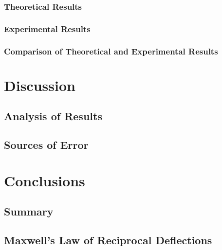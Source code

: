 \documentclass[12pt, titlepage]{article}
\begin{document}
\subsubsection{Theoretical Results}
\subsubsection{Experimental Results}
\subsubsection{Comparison of Theoretical and Experimental Results}
\newpage
\section{Discussion}
\subsection{Analysis of Results}
\subsection{Sources of Error}
\newpage
\section{Conclusions}
\subsection{Summary}
\subsection{Maxwell's Law of Reciprocal Deflections}
\end{document}
